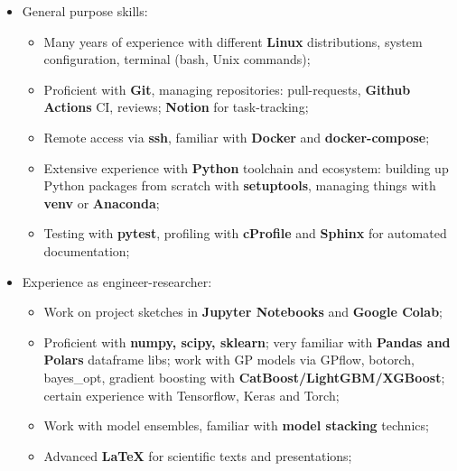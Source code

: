 \documentclass[12pt,a4paper,roman]{moderncv}
\begin{document}
 \begin{itemize}
 \item General purpose skills: \newline
    \begin{itemize}
        \item Many years of experience with different \textbf{Linux} distributions, system configuration, terminal (bash, Unix commands); \newline
        \item Proficient with \textbf{Git}, managing repositories: pull-requests,  \textbf{Github Actions} CI, reviews; \textbf{Notion} for task-tracking; \newline
        \item Remote access via \textbf{ssh}, familiar with \textbf{Docker} and \textbf{docker-compose}; \newline
        \item Extensive experience with \textbf{Python} toolchain and ecosystem: building up Python packages from scratch with \textbf{setuptools},
managing things with \textbf{venv} or \textbf{Anaconda}; \newline
        \item Testing with \textbf{pytest}, profiling with \textbf{cProfile} and \textbf{Sphinx} for automated documentation; \newline
    \end{itemize}    
 \item Experience as engineer-researcher:\newline
    \begin{itemize}
        \item Work on project sketches in \textbf{Jupyter Notebooks} and \textbf{Google Colab}; \newline
        \item Proficient with \textbf{numpy, scipy, sklearn}; very familiar with \textbf{Pandas and Polars} dataframe libs;
         work with GP models via GPflow, botorch, bayes\_opt, 
        gradient boosting with \textbf{CatBoost/LightGBM/XGBoost}; certain experience with Tensorflow, Keras and Torch; \newline
        \item Work with model ensembles, familiar with \textbf{model stacking} technics; \newline
        \item Advanced \textbf{LaTeX} for scientific texts and presentations; \newline
    \end{itemize} 

\end{itemize}
\end{document}
